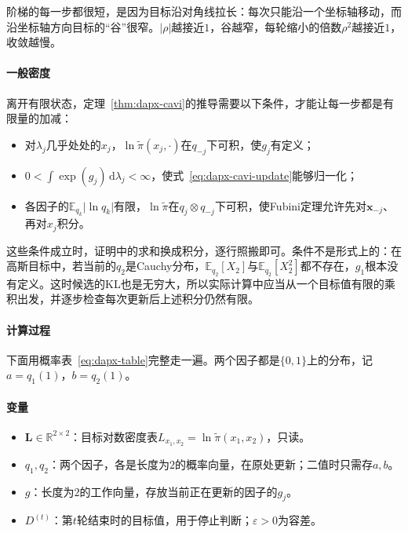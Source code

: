 阶梯的每一步都很短，是因为目标沿对角线拉长：每次只能沿一个坐标轴移动，而沿坐标轴方向目标的“谷”很窄。$\lvert\rho\rvert$越接近$1$，谷越窄，每轮缩小的倍数$\rho^{2}$越接近$1$，收敛越慢。

\paragraph{一般密度}
离开有限状态，定理~\ref{thm:dapx-cavi}的推导需要以下条件，才能让每一步都是有限量的加减：
\begin{itemize}
 \item 对$\lambda_j$几乎处处的$x_j$，$\ln\widetilde{\pi}(x_j,\cdot)$在$q_{-j}$下可积，使$g_j$有定义；
 \item $0<\int\exp(g_j)\,\mathrm{d}\lambda_j<\infty$，使式~\eqref{eq:dapx-cavi-update}能够归一化；
 \item 各因子的$\mathbb{E}_{q_k}\lvert\ln q_k\rvert$有限，$\ln\widetilde{\pi}$在$q_j\otimes q_{-j}$下可积，使Fubini定理允许先对$\bm{x}_{-j}$、再对$x_j$积分。
\end{itemize}
这些条件成立时，证明中的求和换成积分，逐行照搬即可。条件不是形式上的：在高斯目标中，若当前的$q_2$是Cauchy分布，$\mathbb{E}_{q_2}[X_2]$与$\mathbb{E}_{q_2}[X_2^{2}]$都不存在，$g_1$根本没有定义。这时候选的KL也是无穷大，所以实际计算中应当从一个目标值有限的乘积出发，并逐步检查每次更新后上述积分仍然有限。

\paragraph{计算过程}
下面用概率表~\eqref{eq:dapx-table}完整走一遍。两个因子都是$\{0,1\}$上的分布，记$a=q_1(1)$，$b=q_2(1)$。

\paragraph{变量}
\begin{itemize}
 \item $\bm{L}\in\mathbb{R}^{2\times2}$：目标对数密度表$L_{x_1,x_2}=\ln\widetilde{\pi}(x_1,x_2)$，只读。
 \item $q_1,q_2$：两个因子，各是长度为$2$的概率向量，在原处更新；二值时只需存$a,b$。
 \item $g$：长度为$2$的工作向量，存放当前正在更新的因子的$g_j$。
 \item $D^{(t)}$：第$t$轮结束时的目标值，用于停止判断；$\varepsilon>0$为容差。
\end{itemize}

